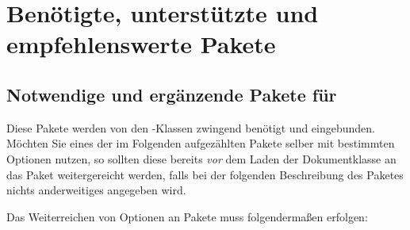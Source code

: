 \chapter{Benötigte, unterstützte und empfehlenswerte Pakete}
%
%
\section{Notwendige und ergänzende Pakete für \TUDScript}
%
Diese Pakete werden von den \TUDScript-Klassen zwingend benötigt und 
eingebunden. Möchten Sie eines der im Folgenden aufgezählten Pakete selber 
mit bestimmten Optionen nutzen, so sollten diese bereits \emph{vor} dem Laden 
der Dokumentklasse an das Paket weitergereicht werden, falls bei der folgenden
Beschreibung des Paketes nichts anderweitiges angegeben wird.
%
\begin{Example}
Das Weiterreichen von Optionen an Pakete muss folgendermaßen erfolgen:
\end{Example}
%
